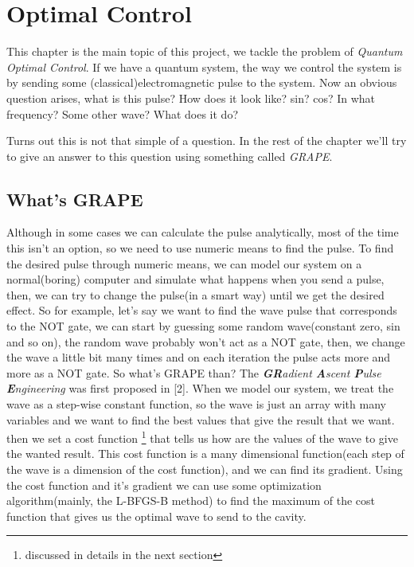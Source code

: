 \documentclass[english, a4paper, 12pt, twoside]{article}
\numberwithin{equation}{section} %
\begin{document}
\newpage
\section{Optimal Control}\label{chap:optimal}
This chapter is the main topic of this project, we tackle the problem of \textit{Quantum Optimal Control}. If we have a quantum system, the way we control the system is by sending some (classical)electromagnetic pulse to the system. Now an obvious question arises, what is this pulse? How does it look like? sin? cos? In what frequency? Some other wave? What does it do?

Turns out this is not that simple of a question. In the rest of the chapter we'll try to give an answer to this question using something called \textit{GRAPE}.

\subsection{What's GRAPE}
Although in some cases we can calculate the pulse analytically, most of the time this isn't an option, so we need to use numeric means to find the pulse. To find the desired pulse through numeric means, we can model our system on a normal(boring) computer and simulate what happens when you send a pulse, then, we can try to change the pulse(in a smart way) until we get the desired effect. So for example, let's say we want to find the wave pulse that corresponds to the NOT gate, we can start by guessing some random wave(constant zero, sin and so on), the random wave probably won't act as a NOT gate, then, we change the wave a little bit many times and on each iteration the pulse acts more and more as a NOT gate.
So what's GRAPE than? The \textit{\textbf{GR}adient \textbf{A}scent \textbf{P}ulse \textbf{E}ngineering} was first proposed in [2]. When we model our system, we treat the wave as a step-wise constant function, so the wave is just an array with many variables and we want to find the best values that give the result that we want. then we set a cost function \footnote{discussed in details in the next section} that tells us how are the values of the wave to give the wanted result. This cost function is a many dimensional function(each step of the wave is a dimension of the cost function), and we can find its gradient. Using the cost function and it's gradient we can use some optimization algorithm(mainly, the L-BFGS-B method) to find the maximum of the cost function that gives us the optimal wave to send to the cavity.
\end{document}
